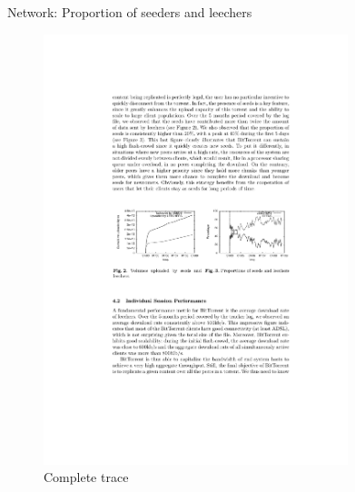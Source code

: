 \begin{frame}{Network: Proportion of seeders and leechers}
	
\begin{figure}	
	\includegraphics[width=0.79\textwidth]{bt-fig6}
	\caption{Complete trace}
\end{figure}	
	
\end{frame}


